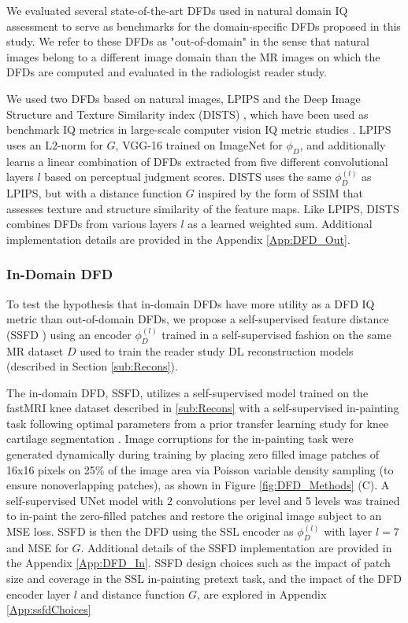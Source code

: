 \documentclass[AMA,STIX2COL,Linenumberson]{MRM}
\begin{document}
We evaluated several state-of-the-art DFDs used in natural domain IQ assessment \cite{gu2022ntire} to serve as benchmarks for the domain-specific DFDs proposed in this study. We refer to these DFDs as "out-of-domain" in the sense that natural images belong to a different image domain than the MR images on which the DFDs are computed and evaluated in the radiologist reader study. 

 We used two DFDs based on natural images, LPIPS and the Deep Image Structure and Texture Similarity index (DISTS) \cite{ding2020image}, which have been used as benchmark IQ metrics in large-scale computer vision IQ metric studies \cite{gu2022ntire}. LPIPS uses an L2-norm for $G$, VGG-16 \cite{simonyan2014very} trained on ImageNet for $\phi_{D}$, and additionally learns a linear combination of DFDs extracted from five different convolutional layers $l$ based on perceptual judgment scores. DISTS uses the same $\phi_D^{(l)}$ as LPIPS, but with a distance function $G$ inspired by the form of SSIM that assesses texture and structure similarity of the feature maps. Like LPIPS, DISTS combines DFDs from various layers $l$ as a learned weighted sum. Additional implementation details are provided in the Appendix \ref{App:DFD_Out}. 

\subsubsection{In-Domain DFD}

To test the hypothesis that in-domain DFDs have more utility as a DFD IQ metric than out-of-domain DFDs, we propose a self-supervised feature distance (SSFD \cite{adamson2021ssfd}) using an encoder $\phi_D^{(l)}$ trained in a self-supervised fashion on the same MR dataset $D$ used to train the reader study DL reconstruction models (described in Section \ref{sub:Recons}). 

The in-domain DFD, SSFD, utilizes a self-supervised model trained on the fastMRI knee dataset described in \ref{sub:Recons} with a self-supervised in-painting task \cite{pathak2016context} following optimal parameters from a prior transfer learning study for knee cartilage segmentation \cite{dominic2023improving}. Image corruptions for the in-painting task were generated dynamically during training by placing zero filled image patches of 16x16 pixels on 25\% of the image area via Poisson variable density sampling (to ensure nonoverlapping patches), as shown in Figure \ref{fig:DFD_Methods} (C). A self-supervised UNet model with 2 convolutions per level and 5 levels was trained to in-paint the zero-filled patches and restore the original image subject to an MSE loss. SSFD is then the DFD using the SSL encoder as $\phi_D^{(l)}$ with layer $l=7$ and MSE for $G$.  Additional details of the SSFD implementation are provided in the Appendix \ref{App:DFD_In}. SSFD design choices such as the impact of patch size and coverage in the SSL in-painting pretext task, and the impact of the DFD encoder layer $l$ and distance function $G$, are explored in Appendix \ref{App:ssfdChoices}
\end{document}
